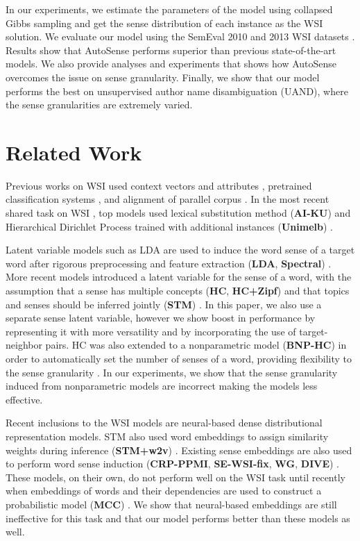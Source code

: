 \documentclass[letterpaper]{article}
\begin{document}
In our experiments, we estimate the parameters of the model using collapsed Gibbs sampling and get the sense distribution of each instance as the WSI solution. We evaluate our model using the SemEval 2010 and 2013 WSI datasets \cite{manandhar2010semeval,jurgens2013semeval}. Results show that AutoSense performs superior than previous state-of-the-art models. We also provide analyses and experiments that shows how AutoSense overcomes the issue on sense granularity. Finally, we show that our model performs the best on unsupervised author name disambiguation (UAND), where the sense granularities are extremely varied.

\section{Related Work}

Previous works on WSI used context vectors and attributes \cite{almuhareb2006msda}, pretrained classification systems \cite{tsvetkov2014augmenting}, and alignment of parallel corpus \cite{yao2012expectations}. In the most recent shared task on WSI \cite{jurgens2013semeval}, top models used lexical substitution method (\textbf{AI-KU}) \cite{baskaya2013ai} and Hierarchical Dirichlet Process trained with additional instances (\textbf{Unimelb}) \cite{lau2013unimelb}.

Latent variable models such as LDA \cite{blei2003latent} are used to induce the word sense of a target word after rigorous preprocessing and feature extraction (\textbf{LDA}, \textbf{Spectral}) \cite{goyal2014unsupervised}.  More recent models introduced a latent variable for the sense of a word, with the assumption that a sense has multiple concepts (\textbf{HC}, \textbf{HC+Zipf}) \cite{chang2014inducing} and that topics and senses should be inferred jointly (\textbf{STM}) \cite{wang2015sense}. In this paper, we also use a separate sense latent variable, however we show boost in performance by representing it with more versatility and by incorporating the use of target-neighbor pairs. HC was also extended to a nonparametric model (\textbf{BNP-HC}) \cite{teh2004sharing} in order to automatically set the number of senses of a word, providing flexibility to the sense granularity \cite{yao2011nonparametric,lau2012word,lau2013unimelb}. In our experiments, we show that the sense granularity induced from nonparametric models are incorrect making the models less effective.

Recent inclusions to the WSI models are neural-based dense distributional representation models. STM also used word embeddings \cite{mikolov2013distributed} to assign similarity weights during inference (\textbf{STM+w2v}) \cite{wang2015sense}. Existing sense embeddings are also used to perform word sense induction (\textbf{CRP-PPMI}, \textbf{SE-WSI-fix}, \textbf{WG}, \textbf{DIVE}) \cite{song2016word,pelevina2016making,chang2018efficient}. These models, on their own, do not perform well on the WSI task until recently when embeddings of words and their dependencies are used to construct a probabilistic model (\textbf{MCC}) \cite{komninos2016structured}. We show that neural-based embeddings are still ineffective for this task and that our model performs better than these models as well.
\end{document}
